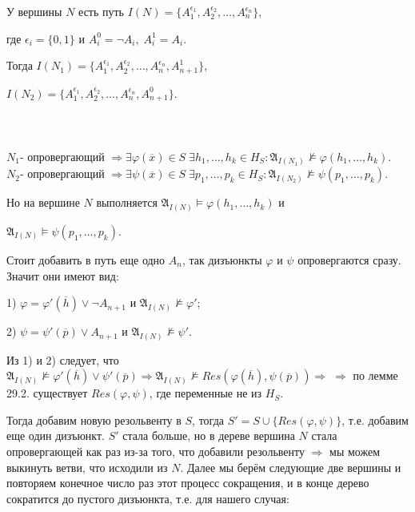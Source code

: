 \documentclass[18pt, a4paper]{extarticle}
\newcommand{\mA}{\mathfrak{A}}
\newcommand{\ovl}[1]{\overline{#1}}
\newcommand{\vp}{\varphi}
\newcommand{\vD}{\vDash}
\newcommand{\res}[2]{Res(#1,#2)}
\newcommand{\lot}[3]{#1_#2,\dots,#1_#3}
\begin{document}
\qquad У вершины $N$ есть путь $I(N)=\{A_1^{\epsilon_1},A_2^{\epsilon_2},\dots,A_n^{\epsilon_n}\}$, 

\qquad где $\epsilon_i=\{0,1\}$ и $A_i^0=\lnot A_i,\;A_i^1=A_i$.

\qquad Тогда $I(N_1)=\{A_1^{\epsilon_1},A_2^{\epsilon_2},\dots,A_n^{\epsilon_n},A_{n+1}^1\}$, 

\qquad $I(N_2)=\{A_1^{\epsilon_1},A_2^{\epsilon_2},\dots,A_n^{\epsilon_n},A_{n+1}^0\}$. \\\\
\\\\
$N_1$- опровергающий $\Rightarrow\exists\vp(\ovl x)\in S\;\exists\lot h 1 k\in H_S\!:\mA_{I(N_1)}\nvDash\vp(\lot h 1 k)$.\\
$N_2$- опровергающий $\Rightarrow\exists\psi(\ovl x)\in S\;\exists\lot p 1 k\in H_S\!:\mA_{I(N_2)}\nvDash\psi(\lot p 1 k)$.

Но на вершине $N$ выполняется $\mA_{I(N)}\vD\vp(\lot h 1 k)$ и 

$\mA_{I(N)}\vD\psi(\lot p 1 k)$. 

Стоит добавить в путь еще одно $A_n$, так дизъюнкты $\vp$ и $\psi$ опровергаются сразу. Значит они имеют вид:

1) $\vp=\vp'(\ovl h)\vee\lnot A_{n+1}$ и $\mA_{I(N)}\nvDash\vp'$;

2) $\psi=\psi'(\ovl p)\vee A_{n+1}$ и $\mA_{I(N)}\nvDash\psi'$.

Из 1) и 2) следует, что $\mA_{I(N)}\nvDash\vp'(\ovl h)\vee\psi'(\ovl p)\Rightarrow\mA_{I(N)}\nvDash\res {\vp(\ovl h)} {\psi(\ovl p)}\Rightarrow\;\Rightarrow$ по лемме 29.2. существует $\res \vp \psi$, где переменные не из $H_S$.

Тогда добавим новую резольвенту в $S$, тогда $S'=S\cup\{\res\vp\psi\}$, т.е. добавим еще один дизъюнкт. $S'$ стала больше, но в дереве вершина $N$ стала опровергающей как раз из-за того, что добавили резольвенту $\Rightarrow$ мы можем выкинуть ветви, что исходили из $N$. Далее мы берём следующие две вершины и повторяем конечное число раз этот процесс сокращения, и в конце дерево сократится до пустого дизъюнкта, т.е. для нашего случая:
\end{document}
